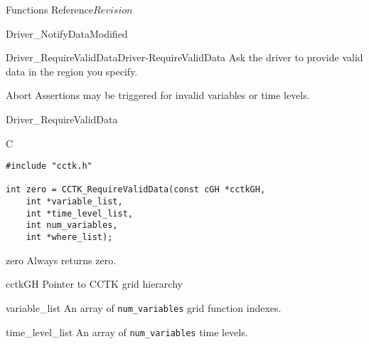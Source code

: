 \begin{cactuspart}{ Functions Reference}{}{$Revision$}
\begin{FunctionDescription}{Driver\_NotifyDataModified}
\begin{SeeAlsoSection}
\begin{SeeAlso2}{Driver\_RequireValidData}{Driver-RequireValidData}
Ask the driver to provide valid data in the region you specify.
\end{SeeAlso2}
\end{SeeAlsoSection}

\begin{ErrorSection}
\begin{Error}{Abort}
Assertions may be triggered for invalid variables or time levels.
\end{Error}
\end{ErrorSection}
\end{FunctionDescription}

\begin{FunctionDescription}{Driver\_RequireValidData}
\label{Driver-RequireValidData}
\begin{SynopsisSection}
\begin{Synopsis}{C}
\begin{verbatim}
#include "cctk.h"

int zero = CCTK_RequireValidData(const cGH *cctkGH,
    int *variable_list,
    int *time_level_list,
    int num_variables,
    int *where_list);

\end{verbatim}
\end{Synopsis}
\end{SynopsisSection}

\begin{ResultSection}
\begin{Result}{zero}
Always returns zero.
\end{Result}
\end{ResultSection}

\begin{ParameterSection}
\begin{Parameter}{cctkGH}
Pointer to CCTK grid hierarchy
\end{Parameter}
\end{ParameterSection}

\begin{ParameterSection}
\begin{Parameter}{variable\_list}
An array of \texttt{num\_variables} grid function indexes.
\end{Parameter}
\end{ParameterSection}

\begin{ParameterSection}
\begin{Parameter}{time\_level\_list}
An array of \texttt{num\_variables} time levels.
\end{Parameter}
\end{ParameterSection}


\end{FunctionDescription}
\end{cactuspart}
